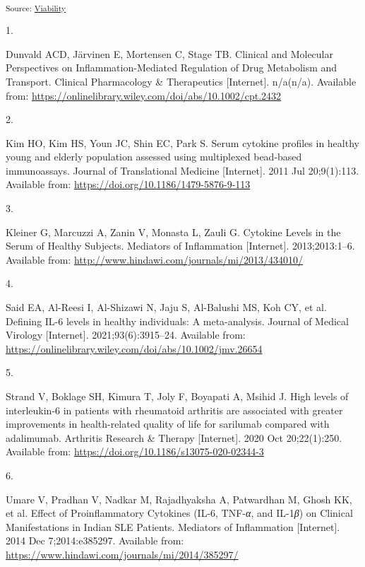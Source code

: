 \documentclass[
  letterpaper,
  DIV=11,
  numbers=noendperiod,
  oneside]{scrartcl}
\newlength{\cslhangindent}
\newlength{\csllabelwidth}
\newenvironment{CSLReferences}[2] %
 {\begin{list}{}{%
  \setlength{\itemindent}{0pt}
  \setlength{\leftmargin}{0pt}
  \setlength{\parsep}{0pt}
  \ifodd #1
   \setlength{\leftmargin}{\cslhangindent}
   \setlength{\itemindent}{-1\cslhangindent}
  \fi
  \setlength{\itemsep}{#2\baselineskip}}}
 {\end{list}}
\newcommand{\CSLLeftMargin}[1]{\parbox[t]{\csllabelwidth}{\strut#1\strut}}
\newcommand{\CSLRightInline}[1]{\parbox[t]{\linewidth - \csllabelwidth}{\strut#1\strut}}
\begin{document}
\textsubscript{Source:
\href{https://andreasludvig.github.io/manuscript/notebooks/viability/Viability-preview.html\#cell-fig-donor-viabilities}{Viability}}

\label{refs}
\begin{CSLReferences}{0}{1}
\CSLLeftMargin{1. }%
\CSLRightInline{Dunvald ACD, Järvinen E, Mortensen C, Stage TB. Clinical
and Molecular Perspectives on Inflammation-Mediated Regulation of Drug
Metabolism and Transport. Clinical Pharmacology \& Therapeutics
{[}Internet{]}. n/a(n/a). Available from:
\url{https://onlinelibrary.wiley.com/doi/abs/10.1002/cpt.2432}}

\CSLLeftMargin{2. }%
\CSLRightInline{Kim HO, Kim HS, Youn JC, Shin EC, Park S. Serum cytokine
profiles in healthy young and elderly population assessed using
multiplexed bead-based immunoassays. Journal of Translational Medicine
{[}Internet{]}. 2011 Jul 20;9(1):113. Available from:
\url{https://doi.org/10.1186/1479-5876-9-113}}

\CSLLeftMargin{3. }%
\CSLRightInline{Kleiner G, Marcuzzi A, Zanin V, Monasta L, Zauli G.
Cytokine Levels in the Serum of Healthy Subjects. Mediators of
Inflammation {[}Internet{]}. 2013;2013:1--6. Available from:
\url{http://www.hindawi.com/journals/mi/2013/434010/}}

\CSLLeftMargin{4. }%
\CSLRightInline{Said EA, Al-Reesi I, Al-Shizawi N, Jaju S, Al-Balushi
MS, Koh CY, et al. Defining IL-6 levels in healthy individuals: A
meta-analysis. Journal of Medical Virology {[}Internet{]}.
2021;93(6):3915--24. Available from:
\url{https://onlinelibrary.wiley.com/doi/abs/10.1002/jmv.26654}}

\CSLLeftMargin{5. }%
\CSLRightInline{Strand V, Boklage SH, Kimura T, Joly F, Boyapati A,
Msihid J. High levels of interleukin-6 in patients with rheumatoid
arthritis are associated with greater improvements in health-related
quality of life for sarilumab compared with adalimumab. Arthritis
Research \& Therapy {[}Internet{]}. 2020 Oct 20;22(1):250. Available
from: \url{https://doi.org/10.1186/s13075-020-02344-3}}

\CSLLeftMargin{6. }%
\CSLRightInline{Umare V, Pradhan V, Nadkar M, Rajadhyaksha A, Patwardhan
M, Ghosh KK, et al. Effect of Proinflammatory Cytokines (IL-6,
TNF-{\emph{α}}, and IL-1{\emph{β}}) on Clinical Manifestations in Indian
SLE Patients. Mediators of Inflammation {[}Internet{]}. 2014 Dec
7;2014:e385297. Available from:
\url{https://www.hindawi.com/journals/mi/2014/385297/}}


\end{CSLReferences}
\end{document}
